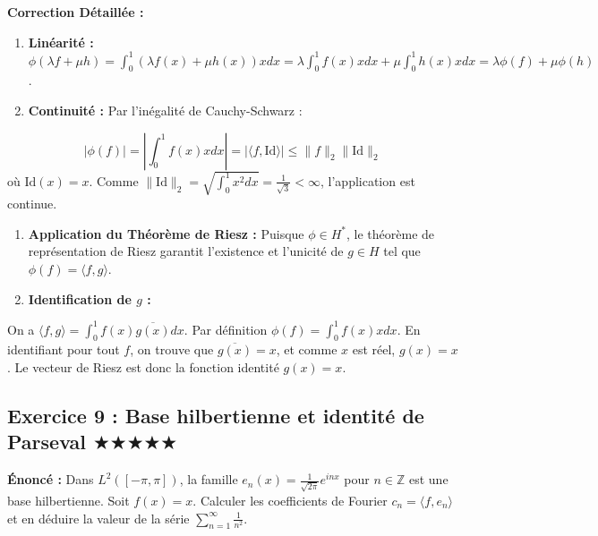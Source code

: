 \documentclass[11pt,a4paper]{article}
\begin{document}
\textbf{Correction Détaillée :}
\begin{enumerate}
\item \textbf{Linéarité :} $\phi(\lambda f + \mu h) = \int_0^1 (\lambda f(x) + \mu h(x))x dx = \lambda \int_0^1 f(x)x dx + \mu \int_0^1 h(x)x dx = \lambda \phi(f) + \mu \phi(h)$.

\item \textbf{Continuité :} Par l'inégalité de Cauchy-Schwarz :
\end{enumerate}
   $$ |\phi(f)| = \left| \int_0^1 f(x) x dx \right| = |\langle f, \text{Id} \rangle| \le \|f\|_2 \|\text{Id}\|_2 $$
   où $\text{Id}(x) = x$. Comme $\|\text{Id}\|_2 = \sqrt{\int_0^1 x^2 dx} = \frac{1}{\sqrt{3}} < \infty$, l'application est continue.
\begin{enumerate}
\item \textbf{Application du Théorème de Riesz :} Puisque $\phi \in H^*$, le théorème de représentation de Riesz garantit l'existence et l'unicité de $g \in H$ tel que $\phi(f) = \langle f, g \rangle$.

\item \textbf{Identification de $g$ :}
\end{enumerate}
   On a $\langle f, g \rangle = \int_0^1 f(x) \overline{g(x)} dx$.
   Par définition $\phi(f) = \int_0^1 f(x) x dx$.
   En identifiant pour tout $f$, on trouve que $\overline{g(x)} = x$, et comme $x$ est réel, $g(x) = x$.
   Le vecteur de Riesz est donc la fonction identité $g(x) = x$.



\subsection*{Exercice 9 : Base hilbertienne et identité de Parseval \quad $\bigstar\bigstar\bigstar\bigstar\bigstar$}

\textbf{Énoncé :}
Dans $L^2([-\pi, \pi])$, la famille $e_n(x) = \frac{1}{\sqrt{2\pi}} e^{inx}$ pour $n \in \mathbb{Z}$ est une base hilbertienne. Soit $f(x) = x$. Calculer les coefficients de Fourier $c_n = \langle f, e_n \rangle$ et en déduire la valeur de la série $\sum_{n=1}^\infty \frac{1}{n^2}$.
\end{document}
